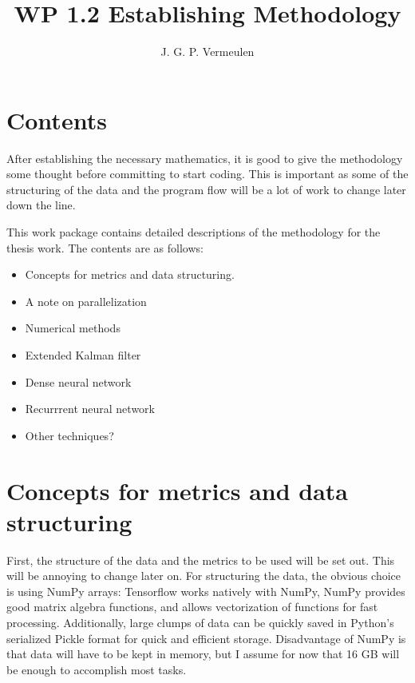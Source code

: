 \documentclass[a4paper,10pt]{article}
\title{WP 1.2 Establishing Methodology}
\author{J. G. P. Vermeulen}
\begin{document}
\maketitle

\section{Contents}
After establishing the necessary mathematics, it is good to give the methodology some thought before committing to start coding. This is important as some of the structuring of the data and the program flow will be a lot of work to change later down the line. 

This work package contains detailed descriptions of the methodology for the thesis work. The contents are as follows:

\begin{itemize}
 \item Concepts for metrics and data structuring.
 \item A note on parallelization
 \item Numerical methods
 \item Extended Kalman filter
 \item Dense neural network
 \item Recurrrent neural network
 \item Other techniques?
\end{itemize}

\section{Concepts for metrics and data structuring}
First, the structure of the data and the metrics to be used will be set out. This will be annoying to change later on. For structuring the data, the obvious choice is using NumPy arrays: Tensorflow works natively with NumPy, NumPy provides good matrix algebra functions, and allows vectorization of functions for fast processing. Additionally, large clumps of data can be quickly saved in Python's serialized Pickle format for quick and efficient storage. Disadvantage of NumPy is that data will have to be kept in memory, but I assume for now that 16 GB will be enough to accomplish most tasks. \\
\end{document}
